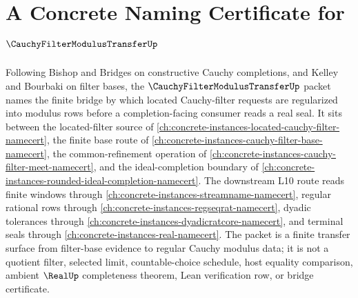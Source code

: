 \chapter{A Concrete Naming Certificate for $\CauchyFilterModulusTransferUp$}
\label{ch:concrete-instances-cauchy-filter-modulus-transfer-namecert}

Following Bishop and Bridges on constructive Cauchy completions, and Kelley and Bourbaki on filter bases, the $\CauchyFilterModulusTransferUp$ packet names the finite bridge by which located Cauchy-filter requests are regularized into modulus rows before a completion-facing consumer reads a real seal. It sits between the located-filter source of \autoref{ch:concrete-instances-located-cauchy-filter-namecert}, the finite base route of \autoref{ch:concrete-instances-cauchy-filter-base-namecert}, the common-refinement operation of \autoref{ch:concrete-instances-cauchy-filter-meet-namecert}, and the ideal-completion boundary of \autoref{ch:concrete-instances-rounded-ideal-completion-namecert}. The downstream L10 route reads finite windows through \autoref{ch:concrete-instances-streamname-namecert}, regular rational rows through \autoref{ch:concrete-instances-regseqrat-namecert}, dyadic tolerances through \autoref{ch:concrete-instances-dyadicratcore-namecert}, and terminal seals through \autoref{ch:concrete-instances-real-namecert}. The packet is a finite transfer surface from filter-base evidence to regular Cauchy modulus data; it is not a quotient filter, selected limit, countable-choice schedule, host equality comparison, ambient $\RealUp$ completeness theorem, Lean verification row, or bridge certificate.


